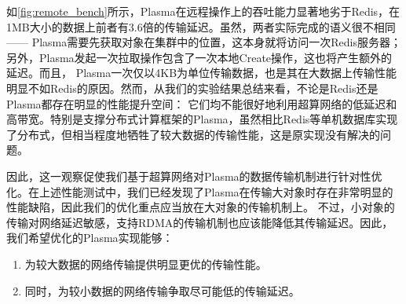 如\autoref{fig:remote_bench}所示，Plasma在远程操作上的吞吐能力显著地劣于Redis，在1MB大小的数据上前者有3.6倍的传输延迟。虽然，两者实际完成的语义很不相同——
Plasma需要先获取对象在集群中的位置，这本身就将访问一次Redis服务器；另外，Plasma发起一次拉取操作包含了一次本地Create操作，这也将产生额外的延迟。而且，
Plasma一次仅以4KB为单位传输数据，也是其在大数据上传输性能明显不如Redis的原因。然而，从我们的实验结果总结来看，不论是Redis还是Plasma都存在明显的性能提升空间：
它们均不能很好地利用超算网络的低延迟和高带宽。特别是支撑分布式计算框架的Plasma，虽然相比Redis等单机数据库实现了分布式，但相当程度地牺牲了较大数据的传输性能，这是原实现没有解决的问题。

因此，这一观察促使我们基于超算网络对Plasma的数据传输机制进行针对性优化。在上述性能测试中，我们已经发现了Plasma在传输大对象时存在非常明显的性能缺陷，因此我们的优化重点应当放在大对象的传输机制上。
不过，小对象的传输对网络延迟敏感，支持RDMA的传输机制也应该能降低其传输延迟。因此，我们希望优化的Plasma实现能够：

\begin{enumerate}
    \item 为较大数据的网络传输提供明显更优的传输性能。
    \item 同时，为较小数据的网络传输争取尽可能低的传输延迟。
\end{enumerate}